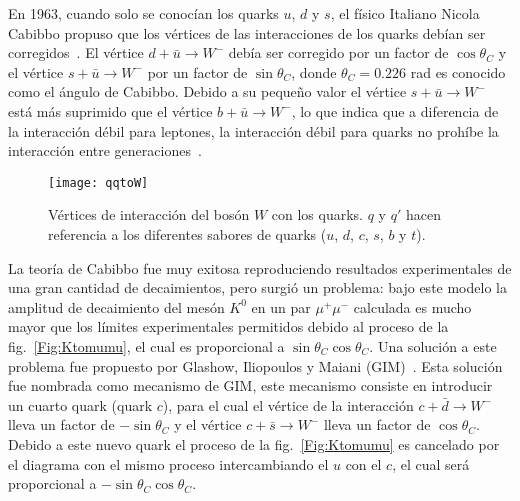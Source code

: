 En 1963, cuando solo se conocían los quarks $u$, $d$ y $s$, el físico Italiano Nicola Cabibbo propuso que los vértices de las interacciones de los quarks debían ser corregidos~\cite{Cabibbo:1963yz}. El vértice $d + \bar{u} \to W^{-}$ debía ser corregido por un factor de $\cos \theta_C$ y el vértice $s + \bar{u} \to W^{-}$ por un factor de $\sin \theta_C$, donde $\theta_C=0.226$ rad es conocido como el ángulo de Cabibbo. Debido a su pequeño valor el vértice $s + \bar{u} \to W^{-}$ está más suprimido que el vértice $b + \bar{u} \to W^{-}$, lo que indica que a diferencia de la interacción débil para leptones, la interacción débil para quarks no prohíbe la interacción entre generaciones~\cite{Cabibbo:1963yz}.
%
\begin{figure}
\centering
\texttt{[image: qqtoW]}
\caption{Vértices de interacción del bosón $W$ con los quarks. $q$ y $q'$ hacen referencia a los diferentes sabores de quarks ($u$, $d$, $c$, $s$, $b$ y $t$).}
\label{Fig:qqtoW}
\end{figure}
%
La teoría de Cabibbo fue muy exitosa reproduciendo resultados experimentales de una gran cantidad de decaimientos, pero surgió un problema: bajo este modelo la amplitud de decaimiento del mesón $K^{0}$ en un par $\mu^{+}\mu^{-}$ calculada es mucho mayor que los límites experimentales permitidos debido al proceso de la fig.~\ref{Fig:Ktomumu}, el cual es proporcional a $\sin \theta_C \cos \theta_C$. Una solución a este problema fue propuesto por Glashow, Iliopoulos y Maiani (GIM)~\cite{Glashow:1970gm}. Esta solución fue nombrada como mecanismo de GIM, este mecanismo consiste en introducir un cuarto quark (quark $c$), para el cual el vértice de la interacción $c + \bar{d} \to W^{-}$ lleva un factor de $-\sin \theta_C$ y el vértice $c + \bar{s} \to W^{-}$ lleva un factor de $\cos \theta_C$. Debido a este nuevo quark el proceso de la fig.~\ref{Fig:Ktomumu} es cancelado por el diagrama con el mismo proceso intercambiando el $u$ con el $c$, el cual será proporcional a $-\sin \theta_C \cos \theta_C$.


